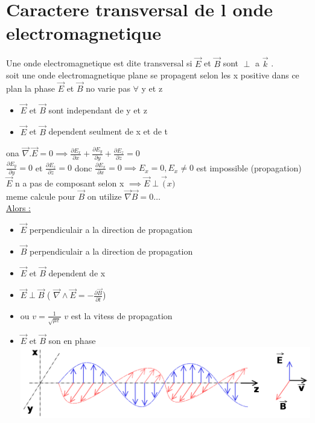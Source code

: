 \documentclass[12pt]{book}
\begin{document}
        \section{Caractere transversal de l onde electromagnetique}
            Une onde electromagnetique est dite transversal si $\vec{E}$ et $\vec{B}$ sont $\perp $ a $\vec{k}$ .
            \\ soit une onde electromagnetique plane se propagent selon les x positive dans ce plan la phase $\vec{E}$ et $\vec{B}$ no varie pas $\forall$ y et z 
            \begin{itemize}
                \item $\vec{E}$ et $\vec{B}$ sont independant de y et z
                \item $\vec{E}$ et $\vec{B}$ dependent seulment de x et de t
            \end{itemize}
            ona $ \vec{\nabla}.\vec{E} =0 \implies \frac{\partial E_x}{\partial x} + \frac{\partial E_y}{\partial y} + \frac{\partial E_z}{\partial z} =0 $ \\
            $ \frac{\partial E_y}{\partial y} =0 $ et $  \frac{\partial E_z}{\partial z} =0 $ donc $ \frac{\partial E_x}{\partial x} =0 \implies E_x =0  , E_x \not = 0$ est impossible (propagation) \\
            $\vec{E} $ n a pas de composant selon x $ \implies \vec{E} \perp \vec(x)$ \\
            meme calcule pour $\vec{B} $ on utilize $\vec{\nabla}\vec{B}=0 \ldots $ \\
            \underline{Alors :}
                \begin{itemize}
                    \item $\vec{E}$ perpendiculair a la direction de propagation
                    \item $\vec{B}$ perpendiculair a la direction de propagation
                    \item $\vec{E}$ et $\vec{B}$ dependent de x
                    \item $\vec{E} \perp \vec{B}$ ( $\vec{\nabla}\wedge\vec{E} = -\frac{\partial \vec{B}}{\partial t}$) 
                    \item {} ou $v = \frac{1}{\sqrt{\mu\varepsilon}}$ $v$ est la vitess de propagation
                    \item $\vec{E}$ et $\vec{B}$ son en phase \\ \includegraphics[width = 0.6\linewidth]{pic/Onde_electromagnetique.png}
                \end{itemize}
\end{document}
